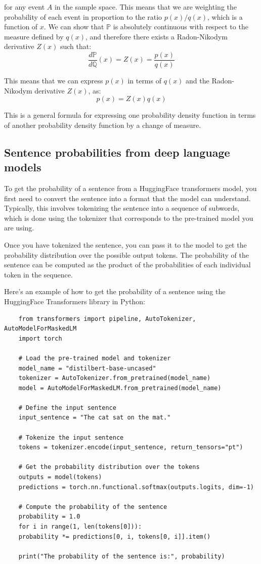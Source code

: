 \documentclass{article}
\begin{document}
for any event $A$ in the sample space. This means that we are weighting the probability of each event in proportion to the ratio $p(x)/q(x)$, which is a function of $x$. We can show that $\mathbb{P}$ is absolutely continuous with respect to the measure defined by $q(x)$, and therefore there exists a Radon-Nikodym derivative $Z(x)$ such that:
$$\frac{d\mathbb{P}}{d\mathbb{Q}}(x) = Z(x) = \frac{p(x)}{q(x)}$$

This means that we can express $p(x)$ in terms of $q(x)$ and the Radon-Nikodym derivative $Z(x)$, as:
$$p(x) = Z(x) q(x)$$

This is a general formula for expressing one probability density function in terms of another probability density function by a change of measure.

\subsection{Sentence probabilities from deep language models}
\label{sec:huggingface_sentence_probs}

To get the probability of a sentence from a HuggingFace transformers model, you first need to convert the sentence into a format that the model can understand. Typically, this involves tokenizing the sentence into a sequence of subwords, which is done using the tokenizer that corresponds to the pre-trained model you are using.

Once you have tokenized the sentence, you can pass it to the model to get the probability distribution over the possible output tokens. The probability of the sentence can be computed as the product of the probabilities of each individual token in the sequence.

Here's an example of how to get the probability of a sentence using the HuggingFace Transformers library in Python:

\begin{verbatim}
    from transformers import pipeline, AutoTokenizer, AutoModelForMaskedLM
    import torch
    
    # Load the pre-trained model and tokenizer
    model_name = "distilbert-base-uncased"
    tokenizer = AutoTokenizer.from_pretrained(model_name)
    model = AutoModelForMaskedLM.from_pretrained(model_name)
    
    # Define the input sentence
    input_sentence = "The cat sat on the mat."
    
    # Tokenize the input sentence
    tokens = tokenizer.encode(input_sentence, return_tensors="pt")
    
    # Get the probability distribution over the tokens
    outputs = model(tokens)
    predictions = torch.nn.functional.softmax(outputs.logits, dim=-1)
    
    # Compute the probability of the sentence
    probability = 1.0
    for i in range(1, len(tokens[0])):
    probability *= predictions[0, i, tokens[0, i]].item()
    
    print("The probability of the sentence is:", probability)
\end{verbatim}
\end{document}
